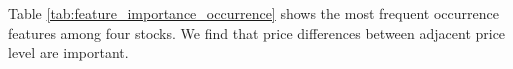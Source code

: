 Table \ref{tab:feature_importance_occurrence} shows the most frequent occurrence features among four stocks. We find that price differences between adjacent price level are important.
	\begin{table}[hp]
		\caption{The most frequent occurrence features among four stocks}
		\label{tab:feature_importance_occurrence}
		\begin{center}
		\end{center}
	\end{table}


